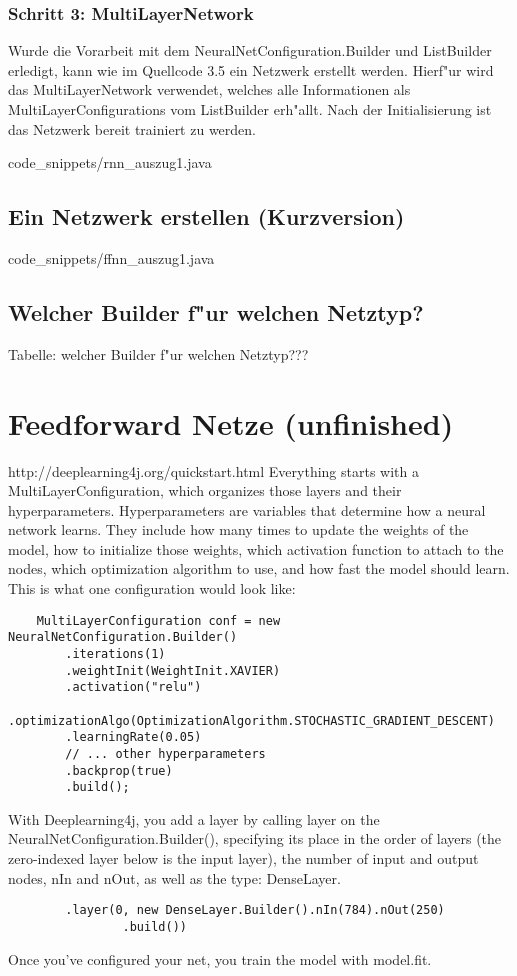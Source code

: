{\subsubsection{Schritt 3: MultiLayerNetwork}
Wurde die Vorarbeit mit dem NeuralNetConfiguration.Builder und ListBuilder erledigt, kann wie im Quellcode 3.5 ein Netzwerk erstellt werden. Hierf"ur wird das MultiLayerNetwork verwendet, welches alle Informationen als MultiLayerConfigurations vom ListBuilder erh"allt. Nach der Initialisierung ist das Netzwerk bereit trainiert zu werden.

{code_snippets/rnn_auszug1.java}

\subsection{Ein Netzwerk erstellen (Kurzversion)}

{code_snippets/ffnn_auszug1.java}

\subsection{Welcher Builder f"ur welchen Netztyp?}
Tabelle: welcher Builder f"ur welchen Netztyp???



\section{Feedforward Netze (unfinished)}
http://deeplearning4j.org/quickstart.html
Everything starts with a MultiLayerConfiguration, which organizes those layers and their hyperparameters.
Hyperparameters are variables that determine how a neural network learns. They include how many times to update the weights of the model, how to initialize those weights, which activation function to attach to the nodes, which optimization algorithm to use, and how fast the model should learn. This is what one configuration would look like:
\begin{lstlisting}
    MultiLayerConfiguration conf = new NeuralNetConfiguration.Builder()
        .iterations(1)
        .weightInit(WeightInit.XAVIER)
        .activation("relu")
        .optimizationAlgo(OptimizationAlgorithm.STOCHASTIC_GRADIENT_DESCENT)
        .learningRate(0.05)
        // ... other hyperparameters
        .backprop(true)
        .build();
\end{lstlisting}
With Deeplearning4j, you add a layer by calling layer on the NeuralNetConfiguration.Builder(), specifying its place in the order of layers (the zero-indexed layer below is the input layer), the number of input and output nodes, nIn and nOut, as well as the type: DenseLayer.
\begin{lstlisting}
        .layer(0, new DenseLayer.Builder().nIn(784).nOut(250)
                .build())
\end{lstlisting}
Once you’ve configured your net, you train the model with model.fit.




}
